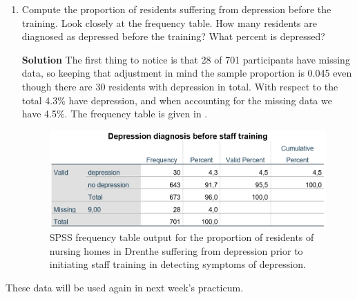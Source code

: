 \begin{enumerate}
\begin{enumerate}
        \item Compute the proportion of residents suffering from depression before the training. Look closely at the frequency table. How many residents are diagnosed as depressed before the training? What percent is depressed?
        \begin{framed}{\textbf{Solution}}
        The first thing to notice is that 28 of 701 participants have missing data, so keeping that adjustment in mind the sample proportion is 0.045 even though there are 30 residents with depression in total. With respect to the total 4.3\% have depression, and when accounting for the missing data we have 4.5\%. The frequency table is given in .
        \end{framed}
        \begin{figure}[h]
            \centering
            \includegraphics[width=0.68\linewidth]{STATS1BHW5Q5b-tabonly.png}
            \caption{SPSS frequency table output for the proportion of residents of nursing homes in Drenthe suffering from depression prior to initiating staff training in detecting symptoms of depression.}
            \label{tab:hw5q5b}
        \end{figure}
    \end{enumerate}
    These data will be used again in next week’s practicum.
\end{enumerate}


